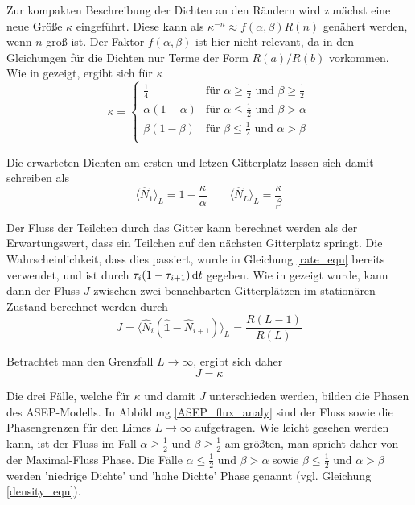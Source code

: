 \documentclass[10pt,a4paper]{report}
\begin{document}
Zur kompakten Beschreibung der Dichten an den Rändern wird zunächst eine neue Größe $\kappa$ eingeführt. Diese kann als $\kappa^{-n}\approx f(\alpha,\beta)R(n)$ genähert werden, wenn $n$ groß ist. Der Faktor $f(\alpha,\beta)$ ist hier nicht relevant, da in den Gleichungen für die Dichten nur Terme der Form $R(a)/R(b)$ vorkommen. Wie in \cite{ASEP} gezeigt, ergibt sich für $\kappa$
\begin{equation}
\kappa=
\begin{cases}
\frac{1}{4}&\text{für }\alpha\geq\frac{1}{2}\text{ und }\beta\geq\frac{1}{2}\\
\alpha(1-\alpha)&\text{für }\alpha\leq\frac{1}{2}\text{ und }\beta>\alpha\\
\beta(1-\beta)&\text{für }\beta\leq\frac{1}{2}\text{ und }\alpha>\beta\\
\end{cases}
\end{equation}

Die erwarteten Dichten am ersten und letzen Gitterplatz lassen sich damit schreiben als
\begin{equation}
\langle\hat{N}_1\rangle_L=1-\frac{\kappa}{\alpha} \qquad \langle\hat{N}_L\rangle_L=\frac{\kappa}{\beta}
\end{equation}

Der Fluss der Teilchen durch das Gitter kann berechnet werden als der Erwartungswert, dass ein Teilchen auf den nächsten Gitterplatz springt. Die Wahrscheinlichkeit, dass dies passiert, wurde in Gleichung \ref{rate_equ} bereits verwendet, und ist durch $\tau_i(1-\tau_{i+1})\dif t$ gegeben. Wie in \cite{ASEP} gezeigt wurde, kann dann der Fluss $J$ zwischen zwei benachbarten Gitterplätzen im stationären Zustand berechnet werden durch
\begin{equation}
J=\langle\hat{N}_i(\hat{\mathbb{1}}-\hat{N}_{i+1})\rangle_L=\frac{R(L-1)}{R(L)}
\end{equation}

Betrachtet man den Grenzfall $L\rightarrow\infty$, ergibt sich daher
\begin{equation}
J=\kappa
\end{equation}

Die drei Fälle, welche für $\kappa$ und damit $J$ unterschieden werden, bilden die Phasen des ASEP-Modells. In Abbildung \ref{ASEP_flux_analy} sind der Fluss sowie die Phasengrenzen für den Limes $L\rightarrow\infty$ aufgetragen. Wie leicht gesehen werden kann, ist der Fluss im Fall $\alpha\geq\frac{1}{2}\text{ und }\beta\geq\frac{1}{2}$ am größten, man spricht daher von der Maximal-Fluss Phase. Die Fälle $\alpha\leq\frac{1}{2}\text{ und }\beta>\alpha$ sowie $\beta\leq\frac{1}{2}\text{ und }\alpha>\beta$ werden 'niedrige Dichte' und 'hohe Dichte' Phase genannt (vgl. Gleichung~ \ref{density_equ}).
\end{document}
